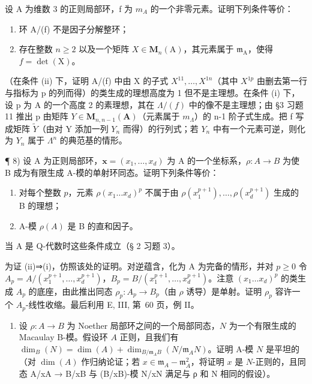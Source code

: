 设 A 为维数 3 的正则局部环，f 为 \(m_{A}\) 的一个非零元素。证明下列条件等价：

\begin{enumerate}
\def\labelenumi{(\roman{enumi})}
\item
  环 A/(f) 不是因子分解整环；
\item
  存在整数 \(n \geqslant 2\) 以及一个矩阵 \(X \in \mathbf{M}_n(\mathrm{A})\)，其元素属于 \(\mathfrak{m}_{\mathrm{A}}\)，使得 \(f = \det(\mathrm{X})\)。
\end{enumerate}

（在条件 (ii) 下，证明 A/(f) 中由 X 的子式 \(X^{11}, \ldots, X^{1n}\)（其中 \(X^{1p}\) 由删去第一行与指标为 p 的列而得）的类生成的理想高度为 1 但不是主理想。在条件 (i) 下，设 p 为 A 的一个高度 2 的素理想，其在 \(\Lambda/(f)\) 中的像不是主理想；由 §3 习题 11 推出 p 由矩阵 \(Y \in \mathbf{M}_{n,n-1}(\mathbf{A})\)（元素属于 \(m_{\Lambda}\)）的 n-1 阶子式生成。把 f 写成矩阵 \(\widetilde{Y}\)（由对 Y 添加一列 \(Y_{n}\) 而得）的行列式；若 \(Y_{n}\) 中有一个元素可逆，则化为 \(Y_{n}\) 属于 \(\Lambda^{n}\) 的典范基的情形。

¶ 8) 设 A 为正则局部环，\(\mathbf{x} = (x_1, \ldots, x_d)\) 为 A 的一个坐标系，\(\rho : A \to B\) 为使 B 成为有限生成 A-模的单射环同态。证明下列条件等价：

\begin{enumerate}
\def\labelenumi{(\roman{enumi})}
\item
  对每个整数 \(p\)，元素 \(\rho(x_1 \ldots x_d)^p\) 不属于由 \(\rho(x_1^{p+1}), \ldots, \rho(x_d^{p+1})\) 生成的 B 的理想；
\item
  A-模 \(\rho(A)\) 是 B 的直和因子。
\end{enumerate}

当 A 是 Q-代数时这些条件成立（§ 2 习题 3）。

为证 (ii)⇒(i)，仿照该处的证明。对逆蕴含，化为 A 为完备的情形，并对 \(p \geqslant 0\) 令 \(A_{p} = A/(x_{1}^{p+1}, \ldots, x_{d}^{p+1})\)，\(B_{p} = B/(x_{1}^{p+1}, \ldots, x_{d}^{p+1})\)。注意 \((x_{1} \ldots x_{d})^{p}\) 的类生成 \(A_{p}\) 的底座，由此推出同态 \(\rho_{p}: A_{p} \to B_{p}\)（由 \(\rho\) 诱导）是单射。证明 \(\rho_{p}\) 容许一个 \(A_{p}\)-线性收缩。最后利用 E, III, 第~60 页，例 II。

\begin{enumerate}
\def\labelenumi{\arabic{enumi})}
\setcounter{enumi}{8}
\tightlist
\item
  设 \(\rho: A \to B\) 为 Noether 局部环之间的一个局部同态，\(N\) 为一个有限生成的 Macaulay B-模。假设环 \(A\) 正则，且我们有 \(\dim_{B}(N) = \dim(A) + \dim_{B/\mathfrak{m}_{A}B}(N/\mathfrak{m}_{A}N)\)。证明 A-模 \(N\) 是平坦的（对 \(\dim(A)\) 作归纳论证；若 \(x \in \mathfrak{m}_{A} - \mathfrak{m}_{A}^{2}\)，将证明 \(x\) 是 \(N\)-正则的，且同态 A/xA → B/xB 与 (B/xB)-模 N/xN 满足与 ρ 和 N 相同的假设）。
\end{enumerate}

